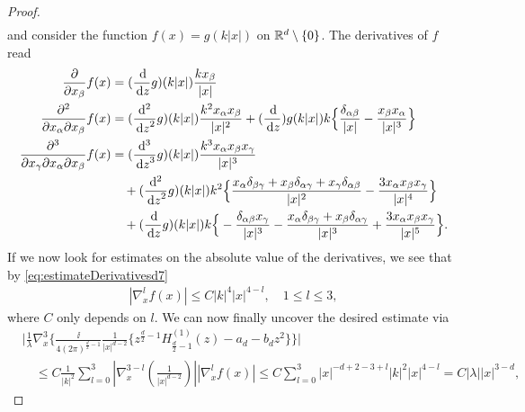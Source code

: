 \begin{proof}
\begin{align*}
\end{align*}
and consider the function $f(x) = g(k |x|)$ on $\mathbb{R}^d \setminus \{0\}$.
The derivatives of $f$ read
\begin{align*}
  \frac{\partial}{\partial x_\beta} f(x)
  &= (\frac{\d{}}{\d z} g)(k|x|) \frac{k x_\beta}{|x|} \\
  \frac{\partial^2}{\partial x_\alpha \partial x_\beta} f(x)
  &= (\frac{\mathrm{d}^2}{\d z^2} g)(k|x|) \frac{k^2 x_\alpha x_\beta}{|x|^2} + (\frac{\d{}}{\d z}) g(k |x|) k \Big\{ \frac{\delta_{\alpha\beta}}{|x|} - \frac{x_\beta x_\alpha}{|x|^3} \Big\} \\
  \frac{\partial^3}{\partial x_\gamma \partial x_\alpha \partial x_\beta} f(x)
  &= (\frac{\mathrm{d}^3}{\d z^3}g)(k |x|) \frac{k^3 x_\alpha x_\beta x_\gamma}{|x|^3} \\
  &\quad + (\frac{\mathrm{d}^2}{\d z^2}g)(k|x|) 
  k^2 \Big\{ \frac{x_\alpha \delta_{\beta\gamma} + x_\beta \delta_{\alpha\gamma} + x_\gamma \delta_{\alpha\beta}}{|x|^2} 
  - \frac{3 x_\alpha x_\beta x_\gamma}{|x|^4} \Big\} \\
  &\quad + (\frac{\d{}}{\d z}g)(k|x|) k \Big\{-\frac{\delta_{\alpha\beta} x_\gamma}{|x|^3} - \frac{x_\alpha \delta_{\beta\gamma} + x_\beta \delta_{\alpha\gamma}}{|x|^3} + \frac{3 x_\alpha x_\beta x_\gamma}{|x|^5} \Big\}.
\end{align*}
If we now look for estimates on the absolute value of the derivatives, we see that by \eqref{eq:estimateDerivativesd7}
\begin{align*}
  |\nabla_x^l f(x)| \leq C |k|^4 |x|^{4 - l}, \quad 1 \leq l \leq 3,
\end{align*}
where $C$ only depends on $l$.
We can now finally uncover the desired estimate via
\begin{align*}
  &\Big|\frac{1}{\lambda} \nabla_x^3 \Big\{ \frac{\ii}{4 (2\pi)^{\frac{d}{2} - 1}} \frac{1}{|x|^{d - 2}} \big\{ z^{\frac{d}{2} - 1} H_{\frac{d}{2} - 1}^{(1)}(z) - a_d - b_d z^2\big\} \Big\} \Big| \\
  &\quad\leq C \frac{1}{|k|^2} \sum_{l = 0}^3 | \nabla_x^{3 - l}(\frac{1}{|x|^{d - 2}})| | \nabla_x^l f(x) | 
  \leq C \sum_{l = 0}^3 |x|^{-d + 2 - 3 + l} |k|^2 |x|^{4 - l} = C |\lambda| |x|^{3 - d},

\end{align*}
\end{proof}
